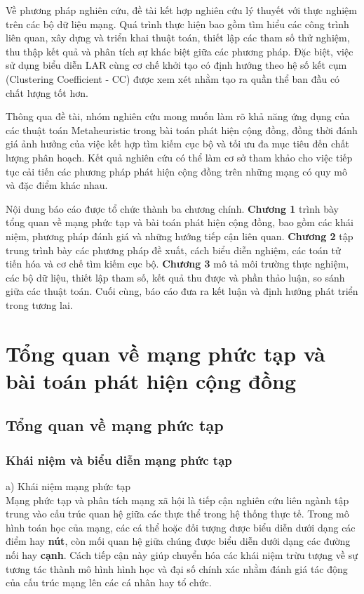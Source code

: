 \documentclass[14pt,a4paper]{extarticle}
\begin{document}
Về phương pháp nghiên cứu, đề tài kết hợp nghiên cứu lý thuyết với thực nghiệm trên các bộ dữ liệu mạng. Quá trình thực hiện bao gồm tìm hiểu các công trình liên quan, xây dựng và triển khai thuật toán, thiết lập các tham số thử nghiệm, thu thập kết quả và phân tích sự khác biệt giữa các phương pháp. Đặc biệt, việc sử dụng biểu diễn LAR cùng cơ chế khởi tạo có định hướng theo hệ số kết cụm (Clustering Coefficient - CC) được xem xét nhằm tạo ra quần thể ban đầu có chất lượng tốt hơn.

Thông qua đề tài, nhóm nghiên cứu mong muốn làm rõ khả năng ứng dụng của các thuật toán Metaheuristic trong bài toán phát hiện cộng đồng, đồng thời đánh giá ảnh hưởng của việc kết hợp tìm kiếm cục bộ và tối ưu đa mục tiêu đến chất lượng phân hoạch. Kết quả nghiên cứu có thể làm cơ sở tham khảo cho việc tiếp tục cải tiến các phương pháp phát hiện cộng đồng trên những mạng có quy mô và đặc điểm khác nhau.

Nội dung báo cáo được tổ chức thành ba chương chính. \textbf{Chương 1} trình bày tổng quan về mạng phức tạp và bài toán phát hiện cộng đồng, bao gồm các khái niệm, phương pháp đánh giá và những hướng tiếp cận liên quan. \textbf{Chương 2} tập trung trình bày các phương pháp đề xuất, cách biểu diễn nghiệm, các toán tử tiến hóa và cơ chế tìm kiếm cục bộ. \textbf{Chương 3} mô tả môi trường thực nghiệm, các bộ dữ liệu, thiết lập tham số, kết quả thu được và phần thảo luận, so sánh giữa các thuật toán. Cuối cùng, báo cáo đưa ra kết luận và định hướng phát triển trong tương lai.

\newpage
\section{Tổng quan về mạng phức tạp và bài toán phát hiện cộng đồng}

\subsection{Tổng quan về mạng phức tạp}
\subsubsection{Khái niệm và biểu diễn mạng phức tạp}

\noindent a) Khái niệm mạng phức tạp
\\ Mạng phức tạp và phân tích mạng xã hội là tiếp cận nghiên cứu liên ngành tập trung vào cấu trúc quan hệ giữa các thực thể trong hệ thống thực tế. Trong mô hình toán học của mạng, các cá thể hoặc đối tượng được biểu diễn dưới dạng các điểm hay \textbf{nút}, còn mối quan hệ giữa chúng được biểu diễn dưới dạng các đường nối hay \textbf{cạnh}. Cách tiếp cận này giúp chuyển hóa các khái niệm trừu tượng về sự tương tác thành mô hình hình học và đại số chính xác nhằm đánh giá tác động của cấu trúc mạng lên các cá nhân hay tổ chức.
\end{document}
